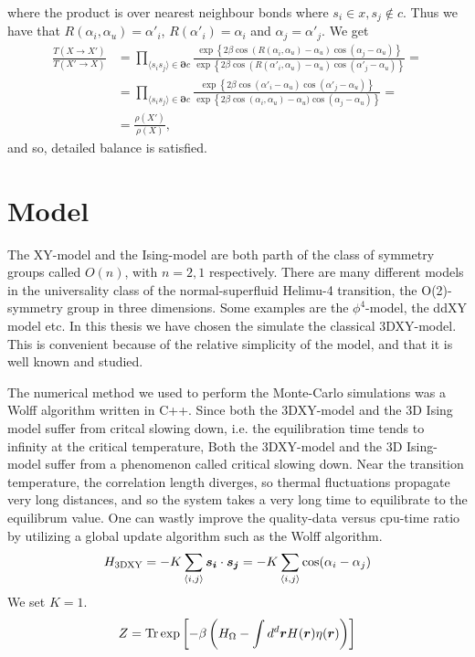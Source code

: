 where the product is over nearest neighbour bonds where $s_i \in x, s_j \notin c$.
Thus we have that $ R(\alpha_i,\alpha_u) = \alpha'_i $, $R(\alpha'_i) = \alpha_i$ and $\alpha_j = \alpha'_j$.
We get
\begin{align}
  \frac{T(X\rightarrow X')}{T(X'\rightarrow X)}&= \prod_{\langle s_i s_j \rangle \in \bm{\partial} c} \frac{ \exp\left\{2\beta\cos(R(\alpha_i,\alpha_u) - \alpha_u)\cos(\alpha_j - \alpha_u)\right\}}{ \exp\left\{2\beta\cos(R(\alpha'_i,\alpha_u) - \alpha_u)\cos(\alpha'_j -\alpha_u)\right\}} = \\
  &= \prod_{\langle s_i s_j \rangle \in \bm{\partial} c} \frac{ \exp\left\{2\beta\cos(\alpha'_i - \alpha_u)\cos(\alpha'_j - \alpha_u)\right\}}{ \exp\left\{2\beta\cos(\alpha_i,\alpha_u) - \alpha_u)\cos(\alpha_j -\alpha_u)\right\}} = \\
  &= \frac{\rho(X')}{\rho(X)},
\end{align}
and so, detailed balance is satisfied.

\section{Model}
The XY-model and the Ising-model are both parth of the class of symmetry groups called $O(n)$, with $n=2,1$ respectively.
There are many different models in the universality class of the normal-superfluid Helimu-4 transition, the O(2)-symmetry group in three dimensions. Some examples are the $\phi^4$-model, the ddXY model etc.
In this thesis we have chosen the simulate the classical 3DXY-model. This is convenient because of the relative simplicity of the model, and that it is well known and studied.

The numerical method we used to perform the Monte-Carlo simulations was a Wolff algorithm written in C++. Since both the 3DXY-model and the 3D Ising model suffer from critcal slowing down, i.e. the equilibration time tends to infinity at the critical temperature, 
Both the 3DXY-model and the 3D Ising-model suffer from a phenomenon called critical slowing down. Near the transition temperature, the correlation length diverges, so thermal fluctuations propagate very long distances, and so the system takes a very long time to equilibrate to the equilibrum value.
One can wastly improve the quality-data versus cpu-time ratio by utilizing a global update algorithm such as the Wolff algorithm. 
\begin{equation}
  H_{\textrm{3DXY}} = -K\sum\limits_{\langle i,j\rangle} \bm{s_i}\cdot\bm{s_j} = -K\sum\limits_{\langle i,j\rangle} \cos(\alpha_i - \alpha_j)
\end{equation}
We set $K=1$.
\begin{equation}
  Z = \textrm{Tr} \exp\left[-\beta \left( H_\Omega - \int d^d \bm{r} H(\bm{r})\eta(\bm{r})\right)\right]
\end{equation}
\begin{equation}
  \label{}
\end{equation}
